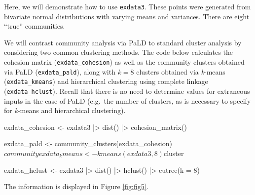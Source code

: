 Here, we will demonstrate how to use \texttt{exdata3}. These points were
generated from bivariate normal distributions with varying means and
variances. There are eight ``true'' communities.

We will contrast community analysis via PaLD to standard cluster
analysis by considering two common clustering methods. The code below
calculates the cohesion matrix (\texttt{exdata\_cohesion}) as well as
the community clusters obtained via PaLD (\texttt{exdata\_pald}), along
with \(k=8\) clusters obtained via \emph{k}-means
(\texttt{exdata\_kmeans}) and hierarchical clustering using complete
linkage (\texttt{exdata\_hclust}). Recall that there is no need to
determine values for extraneous inputs in the case of PaLD (e.g.~the
number of clusters, as is necessary to specify for \emph{k}-means and
hierarchical clustering).

\begin{Schunk}
\begin{Sinput}
exdata_cohesion <- exdata3 |>
  dist() |>
  cohesion_matrix()

exdata_pald <- community_clusters(exdata_cohesion)$community

exdata_kmeans <- kmeans(exdata3, 8)$cluster

exdata_hclust <- exdata3 |>
  dist() |>
  hclust() |>
  cutree(k = 8)
\end{Sinput}
\end{Schunk}

The information is displayed in Figure \ref{fig:fig5}.

